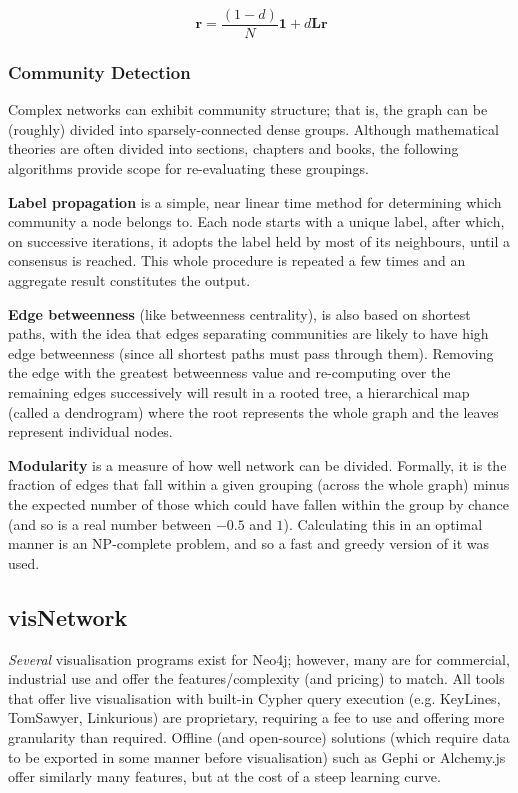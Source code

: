 \begin{equation}~\label{eqn:pagerank}
  \mathbf{r} = \frac{\left(1-d\right)}{N} \mathbf{1} + d\mathbf{Lr}
\end{equation}

\subsubsection{Community Detection}

Complex networks can exhibit community structure; that is, the graph can be
(roughly) divided into sparsely-connected dense groups. Although mathematical
theories are often divided into sections, chapters and books, the following
algorithms provide scope for re-evaluating these groupings.

\textbf{Label propagation} is a simple, near linear time method for
determining which community a node belongs to. Each node starts with a unique
label, after which, on successive iterations, it adopts the label held by most
of its neighbours, until a consensus is reached. This whole procedure is
repeated a few times and an aggregate result constitutes the
output.~\cite{raghavan2007}

\textbf{Edge betweenness} (like betweenness centrality), is also based on
shortest paths, with the idea that edges separating communities are likely to
have high edge betweenness (since all shortest paths must pass through them).
Removing the edge with the greatest betweenness value and re-computing over the
remaining edges successively will result in a rooted tree, a hierarchical map
(called a dendrogram) where the root represents the whole graph and the leaves
represent individual nodes.~\cite{newman2004}

\textbf{Modularity} is a measure of how well network can be divided.
Formally, it is the fraction of edges that fall within a given grouping
(across the whole graph) minus the expected number of those which could have
fallen within the group by chance (and so is a real number between $-0.5$ and
$1$). Calculating this in an optimal manner is an NP-complete problem, and so
a fast and greedy version of it was used.~\cite{clauset2004}

\subsection{visNetwork}

\emph{Several} visualisation programs exist for Neo4j; however, many are for
commercial, industrial use and offer the features/complexity (and pricing) to
match. All tools that offer live visualisation with built-in Cypher query
execution (e.g. KeyLines, TomSawyer, Linkurious) are proprietary, requiring a
fee to use and offering more granularity than required. Offline (and
open-source) solutions (which require data to be exported in some manner before
visualisation) such as Gephi or Alchemy.js offer similarly many features, but at
the cost of a steep learning curve. 


